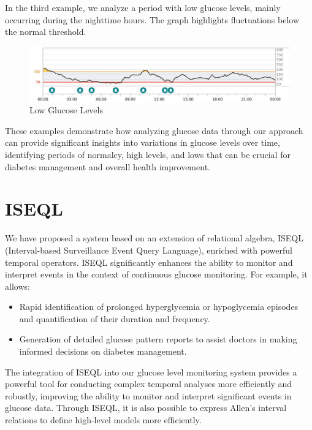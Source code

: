 \documentclass{article}
\begin{document}
In the third example, we analyze a period with low glucose levels, mainly occurring during the nighttime hours. The graph highlights fluctuations below the normal threshold.
\pagebreak

\begin{figure}[h]
    \centering
    \includegraphics[width=1.0\textwidth]{Images/low_glucose.jpeg}
    \caption{Low Glucose Levels}
    \label{fig:low_glucose}
\end{figure}

These examples demonstrate how analyzing glucose data through our approach can provide significant insights into variations in glucose levels over time, identifying periods of normalcy, high levels, and lows that can be crucial for diabetes management and overall health improvement.


\section{ISEQL}
We have proposed a system based on an extension of relational algebra, ISEQL (Interval-based Surveillance Event Query Language), enriched with powerful temporal operators.
ISEQL significantly enhances the ability to monitor and interpret events in the context of continuous glucose monitoring. For example, it allows:

\begin{itemize}
    \item Rapid identification of prolonged hyperglycemia or hypoglycemia episodes and quantification of their duration and frequency.
    \item Generation of detailed glucose pattern reports to assist doctors in making informed decisions on diabetes management.
\end{itemize}

The integration of ISEQL into our glucose level monitoring system provides a powerful tool for conducting complex temporal analyses more efficiently and robustly, improving the ability to monitor and interpret significant events in glucose data. Through ISEQL, it is also possible to express Allen's interval relations to define high-level models more efficiently.
\end{document}
